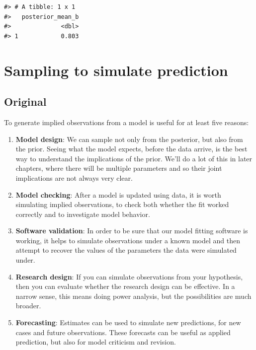 \documentclass[
  letterpaper,
  DIV=11,
  numbers=noendperiod]{scrreprt}
\providecommand{\tightlist}{%
  \setlength{\itemsep}{0pt}\setlength{\parskip}{0pt}}\usepackage{longtable,booktabs,array}
\begin{document}
\begin{verbatim}
#> # A tibble: 1 x 1
#>   posterior_mean_b
#>              <dbl>
#> 1            0.803
\end{verbatim}

\hypertarget{sampling-to-simulate-prediction}{%
\section{Sampling to simulate
prediction}\label{sampling-to-simulate-prediction}}

\hypertarget{original-14}{%
\subsection{Original}\label{original-14}}

To generate implied observations from a model is useful for at least
five reasons:

\begin{enumerate}
\def\labelenumi{\arabic{enumi}.}
\tightlist
\item
  \textbf{Model design}: We can sample not only from the posterior, but
  also from the prior. Seeing what the model expects, before the data
  arrive, is the best way to understand the implications of the prior.
  We'll do a lot of this in later chapters, where there will be multiple
  parameters and so their joint implications are not always very clear.
\item
  \textbf{Model checking}: After a model is updated using data, it is
  worth simulating implied observations, to check both whether the fit
  worked correctly and to investigate model behavior.
\item
  \textbf{Software validation}: In order to be sure that our model
  fitting software is working, it helps to simulate observations under a
  known model and then attempt to recover the values of the parameters
  the data were simulated under.
\item
  \textbf{Research design}: If you can simulate observations from your
  hypothesis, then you can evaluate whether the research design can be
  effective. In a narrow sense, this means doing power analysis, but the
  possibilities are much broader.
\item
  \textbf{Forecasting}: Estimates can be used to simulate new
  predictions, for new cases and future observations. These forecasts
  can be useful as applied prediction, but also for model criticism and
  revision.
\end{enumerate}
\end{document}
